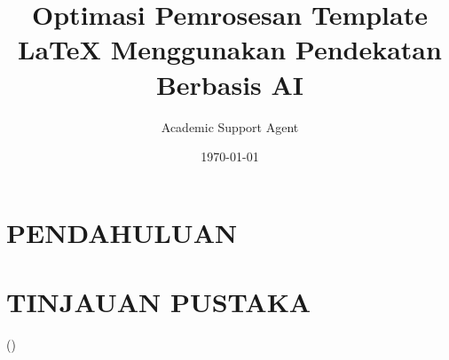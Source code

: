 \documentclass{article}
\title{Optimasi Pemrosesan Template LaTeX Menggunakan Pendekatan Berbasis AI}
\author{Academic Support Agent}
\date{\today}
\begin{document}
\maketitle

\begin{abstract}

\end{abstract}

\chapter{PENDAHULUAN}


\chapter{TINJAUAN PUSTAKA}


\usepackage[portuguese]{babel}
\addto{\captionsportuguese}{%
  \renewcommand{\refname}{\hfill \large REFERÊNCIAS \hfill} %
}
\addto{\captionsportuguese}{%
  \renewcommand{\contentsname}{\hfill SUMÁRIO \hfill}} %
    
\usepackage[T1]{fontenc}
\usepackage{fontspec}
\usepackage{amsmath,esint}
\usepackage{amsfonts}
\usepackage{amssymb}
\usepackage{makeidx}
\usepackage{graphicx}
\usepackage{lettrine}
\usepackage{lmodern}
\usepackage{dirtytalk}
\usepackage{setspace}
    \linespread{1.5}
\usepackage{indentfirst}
    \setlength{\parindent}{1cm}
    \setlength{\parskip}{0pt}
\usepackage{pdfpages}
\usepackage[left=3cm,right=2cm,top=3cm,bottom=2cm]{geometry}
\usepackage{hyperref}
\usepackage{float}
\usepackage{multirow}
\usepackage{booktabs}
\usepackage{subfigure}
\usepackage{fancyhdr}
\usepackage{soul} %

\usepackage[ %
	alf,
	abnt-repeated-title-omit=yes,	
	abnt-emphasize=bf,
	abnt-etal-list=0
	]
	{abntex2cite}
\citebrackets()%

\setmainfont{Times New Roman}
\pagestyle{fancy}
\fancyhead{}
\fancyfoot{}
\fancyhead[R]{\thepage}
\renewcommand{\headrulewidth}{0pt}%
\setlength{\headheight}{14.49998pt}
\end{document}
